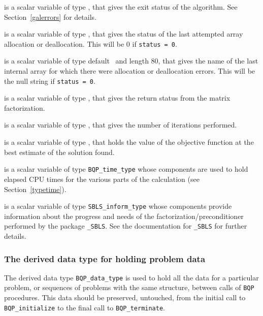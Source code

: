 \documentclass{galahad}
\newcommand{\packagename}{BQP}
\begin{document}
\begin{description}

 is a scalar variable of type \integer, that gives the
exit status of the algorithm. 
See Section~\ref{galerrors} 
for details.

 is a scalar variable of type \integer, that gives
the status of the last attempted array allocation or deallocation.
This will be 0 if {\tt status = 0}.

 is a scalar variable of type default \character\
and length 80, that  gives the name of the last internal array 
for which there were allocation or deallocation errors.
This will be the null string if {\tt status = 0}. 

 is a scalar variable of type \integer, that 
gives the return status from the matrix factorization.

 is a scalar variable of type \integer, that 
gives the number of iterations performed.

 is a scalar variable of type \realdp, that holds the
value of the objective function at the best estimate of the solution found.

 is a scalar variable of type {\tt \packagename\_time\_type} 
whose components are used to hold elapsed CPU times for the various parts 
of the calculation (see Section~\ref{typetime}).

 is a scalar variable of type 
{\tt SBLS\_inform\_type} %
whose components provide information about the progress and needs
of the factorization/preconditioner 
performed by the package 
{\tt \libraryname\_SBLS}. 
See the documentation for {\tt \libraryname\_SBLS} for further details.

\end{description}


\subsubsection{The derived data type for holding problem data}\label{typedata}
The derived data type 
{\tt \packagename\_data\_type} 
is used to hold all the data for a particular problem,
or sequences of problems with the same structure, between calls of 
{\tt \packagename} procedures. 
This data should be preserved, untouched, from the initial call to 
{\tt \packagename\_initialize}
to the final call to
{\tt \packagename\_terminate}.
\end{document}

